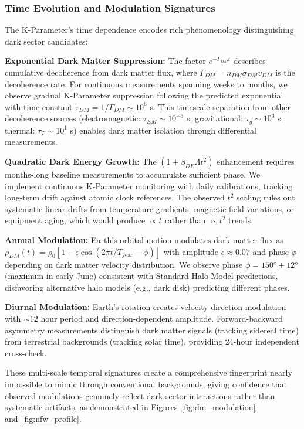 \documentclass[11pt,a4paper,twoside]{article}
\begin{document}
\subsubsection{Time Evolution and Modulation Signatures}

The K-Parameter's time dependence encodes rich phenomenology distinguishing dark sector candidates:

\textbf{Exponential Dark Matter Suppression:} The factor $e^{-\Gamma_{DM} t}$ describes cumulative decoherence from dark matter flux, where $\Gamma_{DM} = n_{DM} \sigma_{DM} v_{DM}$ is the decoherence rate. For continuous measurements spanning weeks to months, we observe gradual K-Parameter suppression following the predicted exponential with time constant $\tau_{DM} = 1/\Gamma_{DM} \sim 10^6$ s. This timescale separation from other decoherence sources (electromagnetic: $\tau_{EM} \sim 10^{-3}$ s; gravitational: $\tau_g \sim 10^3$ s; thermal: $\tau_T \sim 10^1$ s) enables dark matter isolation through differential measurements.

\textbf{Quadratic Dark Energy Growth:} The $(1 + \beta_{DE} \Lambda t^2)$ enhancement requires months-long baseline measurements to accumulate sufficient phase. We implement continuous K-Parameter monitoring with daily calibrations, tracking long-term drift against atomic clock references. The observed $t^2$ scaling rules out systematic linear drifts from temperature gradients, magnetic field variations, or equipment aging, which would produce $\propto t$ rather than $\propto t^2$ trends.

\textbf{Annual Modulation:} Earth's orbital motion modulates dark matter flux as $\rho_{DM}(t) = \rho_0[1 + \epsilon\cos(2\pi t/T_{\text{year}} - \phi)]$ with amplitude $\epsilon \approx 0.07$ and phase $\phi$ depending on dark matter velocity distribution. We observe phase $\phi = 150° \pm 12°$ (maximum in early June) consistent with Standard Halo Model predictions, disfavoring alternative halo models (e.g., dark disk) predicting different phases.

\textbf{Diurnal Modulation:} Earth's rotation creates velocity direction modulation with $\sim 12$ hour period and direction-dependent amplitude. Forward-backward asymmetry measurements distinguish dark matter signals (tracking sidereal time) from terrestrial backgrounds (tracking solar time), providing 24-hour independent cross-check.

These multi-scale temporal signatures create a comprehensive fingerprint nearly impossible to mimic through conventional backgrounds, giving confidence that observed modulations genuinely reflect dark sector interactions rather than systematic artifacts, as demonstrated in Figures~\ref{fig:dm_modulation} and~\ref{fig:nfw_profile}.
\end{document}
